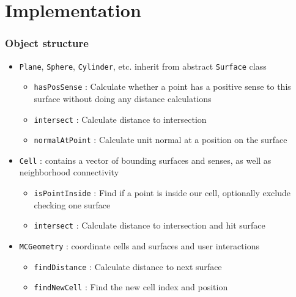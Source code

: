 \documentclass{beamer}
\begin{document}
\section{Implementation}
\begin{frame}
\frametitle{Object structure}
\begin{itemize}
  \item \texttt{Plane}, \texttt{Sphere},
        \texttt{Cylinder}, etc. inherit from abstract \texttt{Surface} class
    \begin{itemize}
      \item \texttt{hasPosSense}
        : Calculate whether a point has a positive sense to this
        surface without doing any distance calculations
      \item \texttt{intersect}
        : Calculate distance to intersection
      \item \texttt{normalAtPoint}
        : Calculate unit normal at a position on the surface
    \end{itemize}
  \item \texttt{Cell} : contains a vector of bounding surfaces and senses, as
    well as neighborhood connectivity
    \begin{itemize}
      \item \texttt{isPointInside}
        : Find if a point is inside our cell, optionally exclude checking one
        surface
      \item \texttt{intersect}
        : Calculate distance to intersection and hit surface
    \end{itemize}
  \item \texttt{MCGeometry} : coordinate cells and surfaces and user
    interactions
    \begin{itemize}
      \item \texttt{findDistance}
        : Calculate distance to next surface
      \item \texttt{findNewCell}
        : Find the new cell index and position
    \end{itemize}
\end{itemize}
\end{frame}
\end{document}
